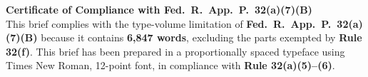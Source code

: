 \documentclass[12pt]{article}
\newcommand{\statute}[1]{\textbf{#1}}
\begin{document}
\vspace{16pt}

\begin{tcolorbox}[
  enhanced,
  colback=NavyDeep!6,
  colframe=NavyDeep!25,
  arc=2pt,
  boxrule=0.5pt,
  left=10pt, right=10pt, top=6pt, bottom=6pt
]
  {\small\color{NavyDeep}\bfseries Certificate of Compliance with Fed.\ R.\ App.\ P.\
  32(a)(7)(B)}\\[4pt]
  {\small\color{SlateGrey}
  This brief complies with the type-volume limitation of \statute{Fed.\ R.\ App.\ P.\
  32(a)(7)(B)} because it contains \textbf{6,847 words}, excluding the parts exempted
  by \statute{Rule 32(f)}. This brief has been prepared in a proportionally spaced
  typeface using Times New Roman, 12-point font, in compliance with
  \statute{Rule 32(a)(5)--(6)}.}
\end{tcolorbox}
\end{document}
